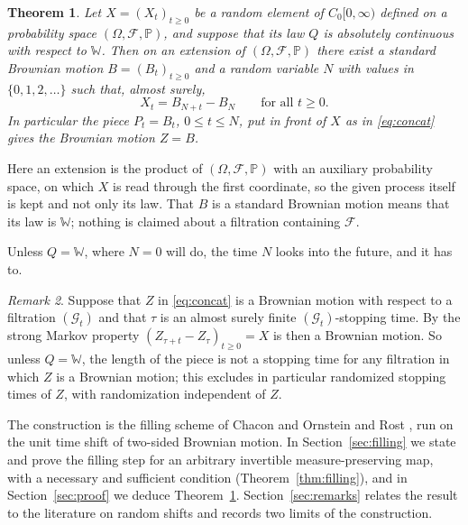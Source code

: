 \documentclass[11pt]{amsart}
\newtheorem{theorem}{Theorem}[section]
\theoremstyle{remark}
\newtheorem{remark}[theorem]{Remark}
\numberwithin{equation}{section}
\newcommand{\Pp}{\mathbb P}
\newcommand{\Wi}{\mathbb W}
\begin{document}
\begin{theorem}\label{thm:main}
Let $X=(X_t)_{t\ge0}$ be a random element of $C_0[0,\infty)$ defined on a probability space $(\Omega,\mathcal F,\Pp)$, and suppose that its law $Q$ is absolutely continuous with respect to $\Wi$. Then on an extension of $(\Omega,\mathcal F,\Pp)$ there exist a standard Brownian motion $B=(B_t)_{t\ge0}$ and a random variable $N$ with values in $\{0,1,2,\dots\}$ such that, almost surely,
\[
X_t=B_{N+t}-B_N\qquad\text{for all }t\ge0 .
\]
In particular the piece $P_t=B_t$, $0\le t\le N$, put in front of $X$ as in \eqref{eq:concat} gives the Brownian motion $Z=B$.
\end{theorem}

Here an extension is the product of $(\Omega,\mathcal F,\Pp)$ with an auxiliary probability space, on which $X$ is read through the first coordinate, so the given process itself is kept and not only its law. That $B$ is a standard Brownian motion means that its law is $\Wi$; nothing is claimed about a filtration containing $\mathcal F$.

Unless $Q=\Wi$, where $N=0$ will do, the time $N$ looks into the future, and it has to.

\begin{remark}\label{rem:stopping}
Suppose that $Z$ in \eqref{eq:concat} is a Brownian motion with respect to a filtration $(\mathcal G_t)$ and that $\tau$ is an almost surely finite $(\mathcal G_t)$-stopping time. By the strong Markov property $(Z_{\tau+t}-Z_\tau)_{t\ge0}=X$ is then a Brownian motion. So unless $Q=\Wi$, the length of the piece is not a stopping time for any filtration in which $Z$ is a Brownian motion; this excludes in particular randomized stopping times of $Z$, with randomization independent of $Z$.
\end{remark}

The construction is the filling scheme of Chacon and Ornstein \cite{CO} and Rost \cite{Rost71a,Rost71b}, run on the unit time shift of two-sided Brownian motion. In Section~\ref{sec:filling} we state and prove the filling step for an arbitrary invertible measure-preserving map, with a necessary and sufficient condition (Theorem~\ref{thm:filling}), and in Section~\ref{sec:proof} we deduce Theorem~\ref{thm:main}. Section~\ref{sec:remarks} relates the result to the literature on random shifts and records two limits of the construction.
\end{document}
